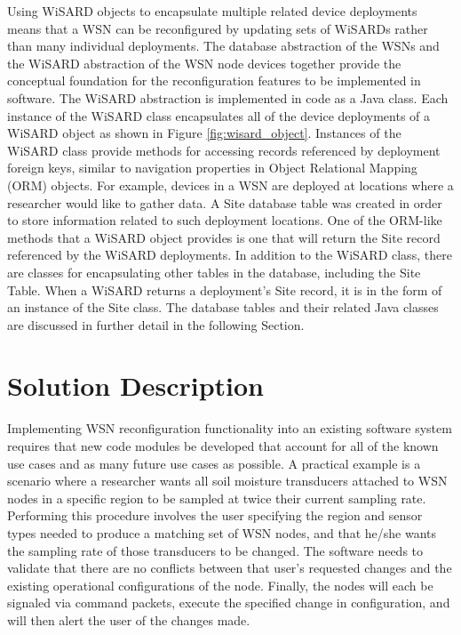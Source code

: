 Using WiSARD objects to encapsulate multiple related device deployments means that a WSN can be reconfigured by updating sets of WiSARDs rather than many individual deployments. The database abstraction of the WSNs and the WiSARD abstraction of the WSN node devices together provide the conceptual foundation for the reconfiguration features to be implemented in software. The WiSARD abstraction is implemented in code as a Java class. Each instance of the WiSARD class encapsulates all of the device deployments of a WiSARD object as shown in Figure \ref{fig:wisard_object}. Instances of the WiSARD class provide methods for accessing records referenced by deployment foreign keys, similar to navigation properties in Object Relational Mapping (ORM) objects. For example, devices in a WSN are deployed at locations where a researcher would like to gather data. A Site database table was created in order to store information related to such deployment locations. One of the ORM-like methods that a WiSARD object provides is one that will return the Site record referenced by the WiSARD deployments. In addition to the WiSARD class, there are classes for encapsulating other tables in the database, including the Site Table. When a WiSARD returns a deployment's Site record, it is in the form of an instance of the Site class. The database tables and their related Java classes are discussed in further detail in the following Section. 


\section{Solution Description}
Implementing WSN reconfiguration functionality into an existing software system requires that new code modules be developed that account for all of the known use cases and as many future use cases as possible. A practical example is a scenario where a researcher wants all soil moisture transducers attached to WSN nodes in a specific region to be sampled at twice their current sampling rate. Performing this procedure involves the user specifying the region and sensor types needed to produce a matching set of WSN nodes, and that he/she wants the sampling rate of those transducers to be changed. The software needs to validate that there are no conflicts between that user's requested changes and the existing operational configurations of the node. Finally, the nodes will each be signaled via command packets, execute the specified change in configuration, and will then alert the user of the changes made.


